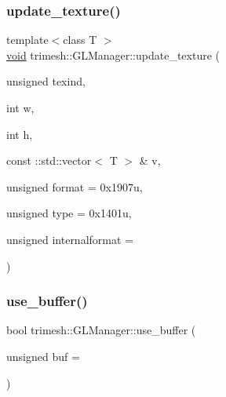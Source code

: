 \mbox{\label{classtrimesh_1_1GLManager_a493a6cf77b925629a99303d7bf863179}} 
\subsubsection{\texorpdfstring{update\+\_\+texture()}{update\_texture()}\hspace{0.1cm}{\footnotesize\ttfamily [2/2]}}
{\footnotesize\ttfamily template$<$class T $>$ \\
\hyperlink{namespacetrimesh_a784ddfd979e1c579bda795a8edfc3f43}{void} trimesh\+::\+G\+L\+Manager\+::update\+\_\+texture (\begin{DoxyParamCaption}\item[{unsigned}]{texind,  }\item[{int}]{w,  }\item[{int}]{h,  }\item[{const \+::std\+::vector$<$ T $>$ \&}]{v,  }\item[{unsigned}]{format = {\ttfamily 0x1907u},  }\item[{unsigned}]{type = {\ttfamily 0x1401u},  }\item[{unsigned}]{internalformat = {} }\end{DoxyParamCaption})\hspace{0.3cm}{\ttfamily [inline]}}

\mbox{\label{classtrimesh_1_1GLManager_a010d6fb6cd1d01835cf193d537d58407}} 
\subsubsection{\texorpdfstring{use\+\_\+buffer()}{use\_buffer()}\hspace{0.1cm}{\footnotesize\ttfamily [1/3]}}
{\footnotesize\ttfamily bool trimesh\+::\+G\+L\+Manager\+::use\+\_\+buffer (\begin{DoxyParamCaption}\item[{unsigned}]{buf = {} }\end{DoxyParamCaption})}




